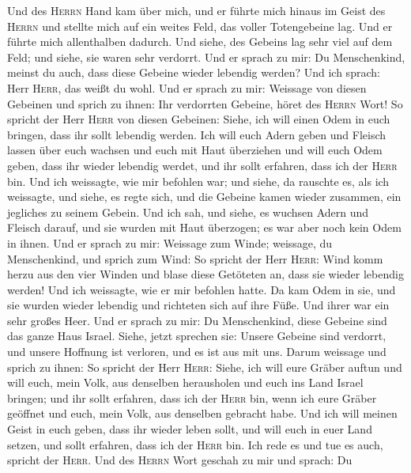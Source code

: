  Und des \textsc{Herrn} Hand kam über mich, und er führte
mich hinaus im Geist des \textsc{Herrn} und stellte mich auf ein weites
Feld, das voller Totengebeine lag.  Und er führte mich
allenthalben dadurch. Und siehe, des Gebeins lag sehr viel auf dem Feld;
und siehe, sie waren sehr verdorrt.  Und er sprach zu mir:
Du Menschenkind, meinst du auch, dass diese Gebeine wieder lebendig
werden? Und ich sprach: Herr \textsc{Herr}, das weißt du wohl.
 Und er sprach zu mir: Weissage von diesen Gebeinen und
sprich zu ihnen: Ihr verdorrten Gebeine, höret des \textsc{Herrn} Wort!
 So spricht der Herr \textsc{Herr} von diesen Gebeinen:
Siehe, ich will einen Odem in euch bringen, dass ihr sollt lebendig
werden.  Ich will euch Adern geben und Fleisch lassen über
euch wachsen und euch mit Haut überziehen und will euch Odem geben, dass
ihr wieder lebendig werdet, und ihr sollt erfahren, dass ich der
\textsc{Herr} bin.  Und ich weissagte, wie mir befohlen
war; und siehe, da rauschte es, als ich weissagte, und siehe, es regte
sich, und die Gebeine kamen wieder zusammen, ein jegliches zu seinem
Gebein.  Und ich sah, und siehe, es wuchsen Adern und
Fleisch darauf, und sie wurden mit Haut überzogen; es war aber noch kein
Odem in ihnen.  Und er sprach zu mir: Weissage zum Winde;
weissage, du Menschenkind, und sprich zum Wind: So spricht der Herr
\textsc{Herr}: Wind komm herzu aus den vier Winden und blase diese
Getöteten an, dass sie wieder lebendig werden!  Und ich
weissagte, wie er mir befohlen hatte. Da kam Odem in sie, und sie wurden
wieder lebendig und richteten sich auf ihre Füße. Und ihrer war ein sehr
großes Heer.  Und er sprach zu mir: Du Menschenkind,
diese Gebeine sind das ganze Haus Israel. Siehe, jetzt sprechen sie:
Unsere Gebeine sind verdorrt, und unsere Hoffnung ist verloren, und es
ist aus mit uns.  Darum weissage und sprich zu ihnen: So
spricht der Herr \textsc{Herr}: Siehe, ich will eure Gräber auftun und
will euch, mein Volk, aus denselben herausholen und euch ins Land Israel
bringen;  und ihr sollt erfahren, dass ich der
\textsc{Herr} bin, wenn ich eure Gräber geöffnet und euch, mein Volk,
aus denselben gebracht habe.  Und ich will meinen Geist
in euch geben, dass ihr wieder leben sollt, und will euch in euer Land
setzen, und sollt erfahren, dass ich der \textsc{Herr} bin. Ich rede es
und tue es auch, spricht der \textsc{Herr}.  Und des
\textsc{Herrn} Wort geschah zu mir und sprach:  Du

